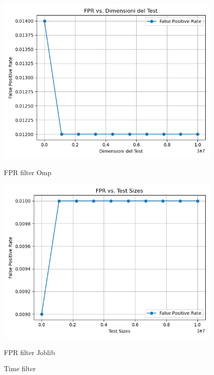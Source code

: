 \documentclass[11pt]{article}
\begin{document}
    \begin{figure}[H]
        \centering
        \includegraphics[width=\linewidth]{omp/001/filter_fpr_plot}
            \caption{FPR filter Omp}\label{fig:filter_fpr_omp}
        \endminipage\hfill
        \includegraphics[width=\linewidth]{joblib/001/filter_fpr_plot}
            \caption{FPR filter Joblib}\label{fig:filter_fpr_joblib}
        \endminipage\hfill
        \caption{Time filter}
    \end{figure}
\end{document}
